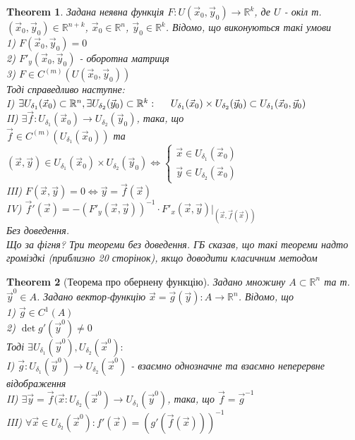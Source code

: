 \documentclass[a4paper, 14pt]{extarticle}
\def\bigline{\vspace{5mm}\\}
\theoremstyle{theoremdd}
\newtheorem{theorem}{Theorem}[subsection]
\theoremstyle{theoremdd}
\theoremstyle{theoremdd}
\theoremstyle{theoremdd}
\theoremstyle{theoremdd}
\theoremstyle{theoremdd}
\theoremstyle{theoremdd}
\theoremstyle{theoremdd}
\begin{document}
\begin{theorem}
Задана неявна функція $F: U(\vec{x}_0,\vec{y}_0) \to \mathbb{R}^k$, де $U$ - окіл т. $(\vec{x}_0,\vec{y}_0) \in \mathbb{R}^{n+k}$, $\vec{x}_0 \in \mathbb{R}^n$, $\vec{y}_0 \in \mathbb{R}^k$. Відомо, що виконуються такі умови\\
1) $F(\vec{x}_0,\vec{y}_0)=0$\\
2) $F'_y(\vec{x}_0,\vec{y}_0)$ - оборотна матриця\\
3) $F \in C^{(m)}(U(\vec{x}_0,\vec{y}_0))$\\
Тоді справедливо наступне:\\
I) $\exists U_{\delta_1}(\vec{x}_0) \subset \mathbb{R}^n, \exists U_{\delta_2}(\vec{y}_0) \subset \mathbb{R}^k: \hspace{0.5cm} U_{\delta_1}(\vec{x}_0) \times U_{\delta_2}(\vec{y}_0) \subset U_{\delta_1}(\vec{x}_0, \vec{y}_0)$\\
II) $\exists \vec{f}: U_{\delta_1}(\vec{x}_0) \to U_{\delta_2}(\vec{y}_0)$, така, що \\ $\vec{f} \in C^{(m)}(U_{\delta_1}(\vec{x}_0))$ та\\
$(\vec{x},\vec{y}) \in U_{\delta_1}(\vec{x}_0) \times U_{\delta_2}(\vec{y}_0) \iff \begin{cases} \vec{x} \in U_{\delta_1}(\vec{x}_0) \\ \vec{y} \in U_{\delta_2}(\vec{x}_0) \end{cases}$\\
III) $F(\vec{x},\vec{y}) = 0 \iff \vec{y}=\vec{f}(\vec{x})$\\
IV) $\vec{f}'(\vec{x}) = -(F'_y(\vec{x},\vec{y}))^{-1} \cdot F'_x(\vec{x},\vec{y})|_{(\vec{x},\vec{f}(\vec{x}))}$\\
\textit{Без доведення.\\
Що за фігня? Три теореми без доведення. ГБ сказав, що такі теореми надто громіздкі (приблизно 20 сторінок), якщо доводити класичним методом}
\bigline
\end{theorem}

\begin{theorem}[Теорема про обернену функцію]
Задано множину $A \subset \mathbb{R}^n$ та т. $\vec{y}^0 \in A$. Задано вектор-функцію $\vec{x} = \vec{g}(\vec{y}): A \to \mathbb{R}^n$. Відомо, що\\
1) $\vec{g} \in C^1(A)$\\
2) $\det g'(\vec{y}^0) \neq 0$\\
Тоді $\exists U_{\delta_1}(\vec{y}^0), U_{\delta_2}(\vec{x}^0):$\\
I) $\vec{g}: U_{\delta_1}(\vec{y}^0) \to U_{\delta_2}(\vec{x}^0)$ - взаємно однозначне та взаємно неперервне відображення\\
II) $\exists \vec{y} = \vec{f}(\vec{x}: U_{\delta_2}(\vec{x}^0) \to U_{\delta_1}(\vec{y}^0)$, така, що $\vec{f} = \vec{g}^{-1}$\\
III) $\forall \vec{x} \in U_{\delta_2}(\vec{x}^0): f'(\vec{x}) = (g'(\vec{f}(\vec{x})))^{-1}$
\end{theorem}
\end{document}
